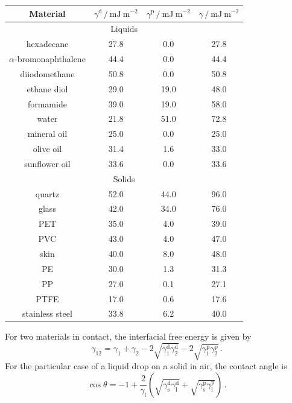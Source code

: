 \documentclass{article}
\theoremstyle{plain}\theoremheaderfont{\normalfont\itshape}\theorembodyfont{\rmfamily}\theoremseparator{.}\newtheorem*{rem}{Remark}\newtheorem*{ex}{Example}\newtheorem*{proof}{Proof}\newtheorem*{altp}{Alternative proof}
\theoremstyle{plain}\theoremheaderfont{\normalfont\bfseries}\theorembodyfont{\rmfamily}\theoremseparator{.}\newtheorem{thm}{Theorem}[section]\newtheorem{lem}[thm]{Lemma}\newtheorem{prop}[thm]{Proposition}\newtheorem*{cor}{Corollary}\newtheorem{defn}[thm]{Definition}\newtheorem{clm}[thm]{Claim}\newtheorem{clminproof}{Claim}\newtheorem*{law}{Law}\newtheorem{pos}[thm]{Postulate}
\theoremstyle{break}\theoremheaderfont{\normalfont\itshape}\theorembodyfont{\rmfamily}\theoremseparator{.\medskip}\newtheorem*{proofskip}{Proof}\newtheorem*{exs}{Examples}\newtheorem*{rems}{Remarks}
\theoremstyle{break}\theoremheaderfont{\normalfont\bfseries}\theorembodyfont{\rmfamily}\theoremseparator{.\medskip}\newtheorem{lemskip}[thm]{Lemma}\newtheorem{defnskip}[thm]{Definition}\newtheorem{propskip}[thm]{Proposition}\newtheorem{thmskip}[thm]{Theorem}
\numberwithin{equation}{section}
\newcommand{\unit}[1]{\ \mathrm{#1}}
\begin{document}
	\begin{table}[ht!]
		\centering
		\begin{tabular}{cccc}
			\toprule
			Material & \(\gamma^{\text{d}}\,/\unit{mJ}\unit{m}^{-2}\) & \(\gamma^{\text{p}}\,/\unit{mJ}\unit{m}^{-2}\) & \(\gamma\,/\unit{mJ}\unit{m}^{-2}\) \\ \midrule
			\multicolumn{4}{c}{Liquids} \\ \midrule
			hexadecane & 27.8 & 0.0 & 27.8 \\
			\(\alpha\)-bromonaphthalene & 44.4 & 0.0 & 44.4 \\
			diiodomethane & 50.8 & 0.0 & 50.8 \\
			ethane diol & 29.0 & 19.0 & 48.0 \\
			formamide & 39.0 & 19.0 & 58.0 \\
			water & 21.8 & 51.0 & 72.8 \\
			mineral oil & 25.0 & 0.0 & 25.0 \\
			olive oil & 31.4 & 1.6 & 33.0 \\
			sunflower oil & 33.6 & 0.0 & 33.6 \\ \midrule 
			\multicolumn{4}{c}{Solids} \\ \midrule
			quartz & 52.0 & 44.0 & 96.0 \\
			glass & 42.0 & 34.0 & 76.0 \\
			PET & 35.0 & 4.0 & 39.0 \\
			PVC & 43.0 & 4.0 & 47.0 \\
			skin & 40.0 & 8.0 & 48.0 \\
			PE & 30.0 & 1.3 & 31.3 \\
			PP & 27.0 & 0.1 & 27.1 \\
			PTFE & 17.0 & 0.6 & 17.6 \\
			stainless steel & 33.8 & 6.2 & 40.0 \\ \bottomrule
		\end{tabular}
	\end{table}

	For two materials in contact, the interfacial free energy is given by
	\begin{equation}
		\gamma_{12}=\gamma_1+\gamma_2-2\sqrt{\gamma_1^{\text{d}}\gamma_2^{\text{d}}}-2\sqrt{\gamma_1^{\text{p}}\gamma_2^{\text{p}}}\,.
	\end{equation}
	For the particular case of a liquid drop on a solid in air, the contact angle is
	\begin{equation}
		\cos\theta=-1+\frac{2}{\gamma_{\text{l}}}\left(\sqrt{\gamma_{\text{s}}^{\text{d}}\gamma_{\text{l}}^{\text{d}}}+\sqrt{\gamma_{\text{s}}^{\text{p}}\gamma_{\text{l}}^{\text{p}}}\right)\,.
	\end{equation}
	
\end{document}
